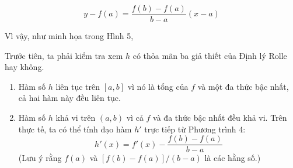 \vspace{3pt}
\[
y - f(a) = \frac{f(b) - f(a)}{b - a}(x - a)
\]
\vspace{-4pt}
\noindent{}
\vspace{5pt}

\noindent
Vì vậy, như minh họa trong Hình 5,

\vspace{3pt}
\noindent{}
\vspace{5pt}

\noindent
Trước tiên, ta phải kiểm tra xem $h$ có thỏa mãn ba giả thiết của Định lý Rolle hay không.

\begin{enumerate}[label=\textbf{\arabic*.}, leftmargin=1.5em, itemsep=5pt, topsep=4pt]
  \item Hàm số $h$ liên tục trên $[a, b]$ vì nó là tổng của $f$ và một đa thức bậc nhất, cả hai hàm này đều liên tục.
  \item Hàm số $h$ khả vi trên $(a, b)$ vì cả $f$ và đa thức bậc nhất đều khả vi. Trên thực tế, ta có thể tính đạo hàm $h'$ trực tiếp từ Phương trình 4:
  \[
  h'(x) = f'(x) - \frac{f(b) - f(a)}{b - a}
  \]
  (Lưu ý rằng $f(a)$ và $[f(b) - f(a)]/(b - a)$ là các hằng số.)
\end{enumerate}
